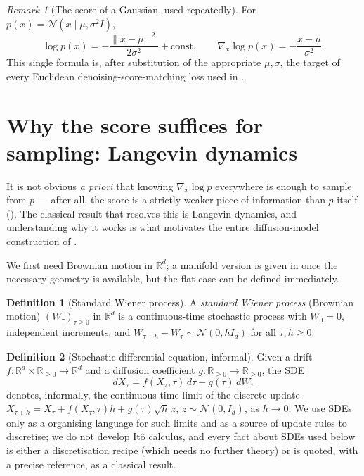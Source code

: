 \documentclass[11pt,a4paper]{report}
\theoremstyle{definition}
\newtheorem{definition}[definition]{Definition}
\theoremstyle{remark}
\newtheorem{remark}[remark]{Remark}
\newcommand{\RR}{\mathbb R}
\begin{document}
\begin{remark}[The score of a Gaussian, used repeatedly]
\label{rem:gaussian-score}
For $p(x)=\mathcal N(x\mid\mu,\sigma^2I)$,
\[
\log p(x) = -\frac{\|x-\mu\|^2}{2\sigma^2} + \text{const},
\qquad
\nabla_x\log p(x) = -\frac{x-\mu}{\sigma^2} .
\]
This single formula is, after substitution of the appropriate $\mu,\sigma$,
the target of every Euclidean denoising-score-matching loss used in
.
\end{remark}

\section{Why the score suffices for sampling: Langevin dynamics}
\label{sec:langevin}

It is not obvious \emph{a priori} that knowing $\nabla_x\log p$ everywhere
is enough to sample from $p$ --- after all, the score is a strictly weaker
piece of information than $p$ itself (). The
classical result that resolves this is Langevin dynamics, and understanding
why it works is what motivates the entire diffusion-model construction of
.

We first need Brownian motion in $\RR^d$; a manifold version is given in
 once the necessary geometry is available, but the flat
case can be defined immediately.

\begin{definition}[Standard Wiener process]
\label{def:wiener}
A \emph{standard Wiener process} (Brownian motion) $(W_\tau)_{\tau\ge0}$ in
$\RR^d$ is a continuous-time stochastic process with $W_0=0$, independent
increments, and $W_{\tau+h}-W_\tau\sim\mathcal N(0,hI_d)$ for all $\tau,h\ge0$.
\end{definition}

\begin{definition}[Stochastic differential equation, informal]
\label{def:sde}
Given a drift $f:\RR^d\times\RR_{\ge0}\to\RR^d$ and a diffusion coefficient
$g:\RR_{\ge0}\to\RR_{\ge0}$, the SDE
\[
dX_\tau = f(X_\tau,\tau)\,d\tau + g(\tau)\,dW_\tau
\]
denotes, informally, the continuous-time limit of the discrete update
$X_{\tau+h} = X_\tau + f(X_\tau,\tau)h + g(\tau)\sqrt h\,z$,
$z\sim\mathcal N(0,I_d)$, as $h\to0$. We use SDEs only as a organising
language for such limits and as a source of update rules to discretise; we
do not develop It\^o calculus, and every fact about SDEs used below is
either a discretisation recipe (which needs no further theory) or is quoted,
with a precise reference, as a classical result.
\end{definition}
\end{document}

